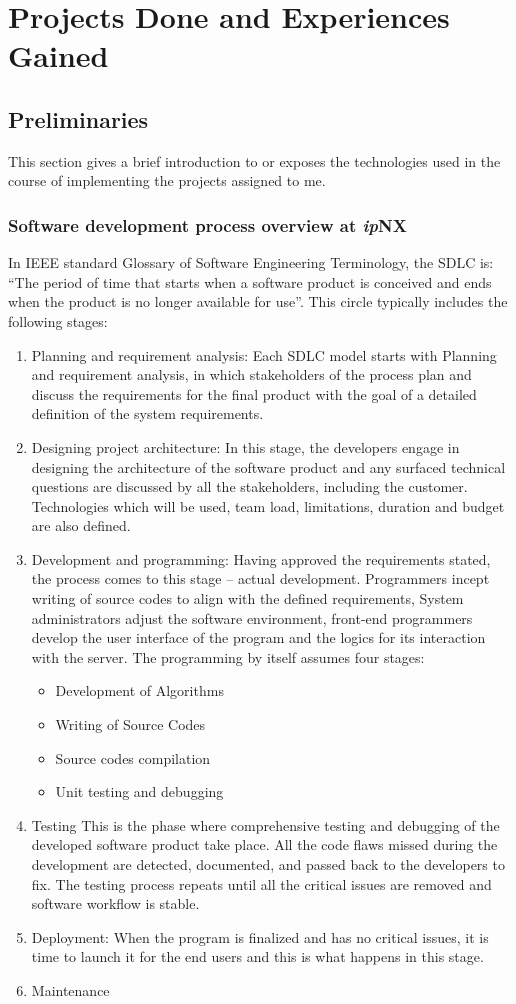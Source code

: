 \chapter{Projects Done and Experiences Gained}
\section{Preliminaries}
This section gives a brief introduction to or exposes the technologies used in the course of implementing the projects assigned to me.
\subsection{Software development process overview at \textit{ip}NX}
In IEEE standard Glossary of Software Engineering
Terminology, the \ac{SDLC} is: “The period of time
that starts when a software product is conceived and ends
when the product is no longer available for use”. This circle typically includes the following stages:
\begin{enumerate}
	\item Planning and requirement analysis: Each \ac{SDLC} model starts with Planning and requirement analysis, in which stakeholders of the process plan and discuss the requirements for the final product with the goal of a detailed definition of the system requirements.
	\item Designing project architecture: In this stage, the developers engage in designing the architecture of the software product and any surfaced technical questions are discussed by all the stakeholders, including the customer. Technologies which will be used, team load, limitations, duration and budget are also defined.
	\item Development and programming: Having approved the requirements stated, the process comes to this stage – actual development. Programmers incept writing of source codes to align with the defined requirements, System administrators adjust the software environment, front-end programmers develop the user interface of the program and the logics for its interaction with the server. 
	The programming by itself assumes four stages:
	\begin{itemize}
		\item Development of Algorithms
		\item Writing of Source Codes
		\item Source codes compilation
		\item Unit testing and debugging
	\end{itemize}
	\item Testing This is the phase where comprehensive testing and debugging of the developed software product take place. All the code flaws missed during the development are detected, documented, and passed back to the developers to fix. The testing process repeats until all the critical issues are removed and software workflow is stable.
	\item Deployment: When the program is finalized and has no critical issues, it is time to launch it for the end users and this is what happens in this stage.
	\item Maintenance
\end{enumerate}

